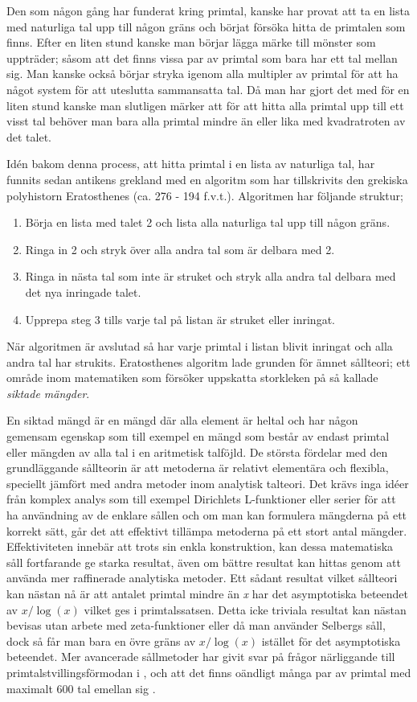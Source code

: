 Den som någon gång har funderat kring primtal, kanske har provat att ta en lista med naturliga tal upp till någon gräns och börjat försöka hitta de primtalen som finns. 
Efter en liten stund kanske man börjar lägga märke till mönster som uppträder; såsom att det finns vissa par av primtal som bara har ett tal mellan sig. 
Man kanske också börjar stryka igenom alla multipler av primtal för att ha något system för att uteslutta sammansatta tal.
Då man har gjort det med för en liten stund kanske man slutligen märker att för att hitta alla primtal upp till ett visst tal behöver man bara alla primtal mindre än eller lika med kvadratroten av det talet.

Idén bakom denna process, att hitta primtal i en lista av naturliga tal, har funnits sedan antikens grekland med en algoritm som har tillskrivits den grekiska polyhistorn Eratosthenes (ca. 276 - 194 f.v.t.). Algoritmen har följande struktur;
\begin{enumerate}
    \item Börja en lista med talet 2 och lista alla naturliga tal upp till någon gräns.
    \item Ringa in 2 och stryk över alla andra tal som är delbara med 2.
    \item Ringa in nästa tal som inte är struket och stryk alla andra tal delbara med det nya inringade talet.
    \item Upprepa steg 3 tills varje tal på listan är struket eller inringat. 
\end{enumerate}
När algoritmen är avslutad så har varje primtal i listan blivit inringat och alla andra tal har strukits. 
Eratosthenes algoritm lade grunden för ämnet sållteori; ett område inom matematiken som försöker uppskatta storkleken på så kallade \textit{siktade mängder}. 

En siktad mängd är en mängd där alla element är heltal och har någon gemensam egenskap som till exempel en mängd som består av endast primtal eller mängden av alla tal i en aritmetisk talföjld.
De största fördelar med den grundläggande sållteorin är att metoderna är relativt elementära och flexibla, speciellt jämfört med andra metoder inom analytisk talteori. 
Det krävs inga idéer från komplex analys som till exempel Dirichlets L-funktioner eller serier för att ha användning av de enklare sållen och om man kan formulera mängderna på ett korrekt sätt, går det att effektivt tillämpa metoderna på ett stort antal mängder. 
Effektiviteten innebär att trots sin enkla konstruktion, kan dessa matematiska såll fortfarande ge starka resultat, även om bättre resultat kan hittas genom att använda mer raffinerade analytiska metoder.
Ett sådant resultat vilket sållteori kan nästan nå är att antalet primtal mindre än \textit{x} har det asymptotiska beteendet av \(x/\log(x)\) vilket ges i primtalssatsen. 
Detta icke triviala resultat kan nästan bevisas utan arbete med zeta-funktioner eller då man använder Selbergs såll, dock så får man bara en övre gräns av \(x/\log(x)\) istället för det asymptotiska beteendet. 
Mer avancerade sållmetoder har givit svar på frågor närliggande till primtalstvillingsförmodan i \cite{chen2Prime}, och att det finns oändligt många par av primtal med maximalt 600 tal emellan sig \cite{mayBound}.

